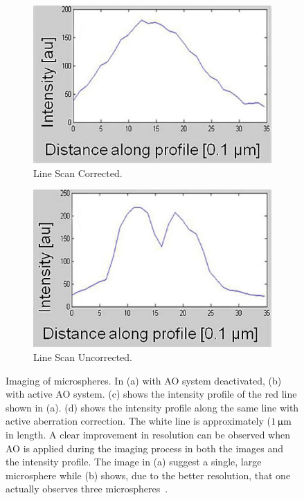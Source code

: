 \begin{figure}[htb]
        \begin{subfigure}[b]{0.25\textwidth}
                \includegraphics[width=\textwidth]{images/wide_direct_c}
                \caption{Line Scan Corrected.}
                \label{fig:wide_direct_c}
        \end{subfigure}
        \begin{subfigure}[b]{0.25\textwidth}
                \includegraphics[width=\textwidth]{images/wide_direct_d}
                \caption{Line Scan Uncorrected.}
                \label{fig:wide_direct_d}
        \end{subfigure}
								
        \caption{Imaging of microspheres. In (a) with AO system deactivated, (b) with active AO system. (c) shows the intensity profile of the red line shown in (a). (d) shows the intensity profile along the same line with active aberration correction. The white line is approximately ($\unit[1]{\upmu m}$ in length. A clear improvement in resolution can be observed when AO is applied during the imaging process in both the images and the intensity profile. The image in (a) suggest a single, large microsphere while (b) shows, due to the better resolution, that one actually observes three microspheres~\cite{wide_directSensing_microscope}.}
\label{fig:wide_direct_results}
\end{figure} 

